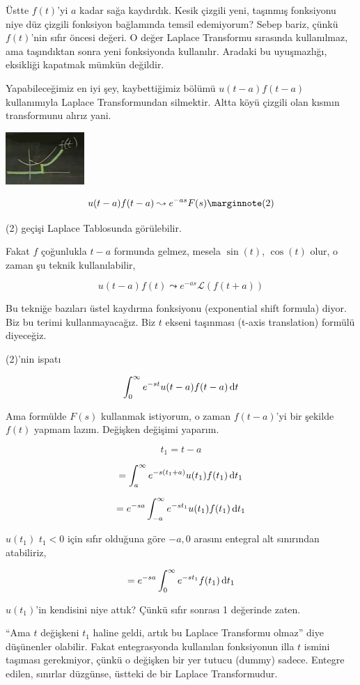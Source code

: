 \documentclass[12pt,fleqn]{article}\usepackage{../../common}
\begin{document}
Üstte $f(t)$'yi $a$ kadar sağa kaydırdık. Kesik çizgili yeni, taşınmış
fonksiyonu niye düz çizgili fonksiyon bağlamında temsil edemiyorum? Sebep
bariz, çünkü $f(t)$'nin sıfır öncesi değeri. O değer Laplace Transformu
sırasında kullanılmaz, ama taşındıktan sonra yeni fonksiyonda
kullanılır. Aradaki bu uyuşmazlığı, eksikliği kapatmak mümkün değildir. 

Yapabileceğimiz en iyi şey, kaybettiğimiz bölümü $u(t-a)f(t-a)$ kullanımıyla
Laplace Transformundan silmektir. Altta köyü çizgili olan kısmın
transformunu alırız yani.

\includegraphics[height=2cm]{22_8.png}

$$ u(t-a)f(t-a) \leadsto e^{-as}F(s) 
\mlabel{2}
$$

(2) geçişi Laplace Tablosunda görülebilir.

Fakat $f$ çoğunlukla $t-a$ formunda gelmez, mesela $\sin(t)$, $\cos(t)$
olur, o zaman şu teknik kullanılabilir,

$$ u(t-a)f(t) \leadsto e^{-as}\mathcal{L}(f(t+a)) $$

Bu tekniğe bazıları üstel kaydırma fonksiyonu (exponential shift formula)
diyor. Biz bu terimi kullanmayacağız. Biz $t$ ekseni taşınması (t-axis
translation) formülü diyeceğiz. 

(2)'nin ispatı

$$ \int_{0}^{\infty}e^{-st}u(t-a)f(t-a) \,\mathrm{d} t $$

Ama formülde $F(s)$ kullanmak istiyorum, o zaman $f(t-a)$'yi bir şekilde
$f(t)$ yapmam lazım. Değişken değişimi yaparım. 

$$ t_1 = t-a $$

$$ = \int_{a}^{\infty}e^{-s(t_1+a)}u(t_1)f(t_1) \,\mathrm{d} t_1 $$

$$ = e^{-sa} \int_{-a}^{\infty}e^{-st_1}u(t_1)f(t_1) \,\mathrm{d} t_1 $$

$u(t_1)$ $t_1<0$ için sıfır olduğuna göre $-a,0$ arasını entegral alt
sınırından atabiliriz, 

$$ = e^{-sa} \int_{0}^{\infty}e^{-st_1}f(t_1) \,\mathrm{d} t_1 $$

$u(t_1)$'in kendisini niye attık? Çünkü sıfır sonrası 1 değerinde zaten. 

``Ama $t$ değişkeni $t_1$ haline geldi, artık bu Laplace Transformu olmaz''
diye düşünenler olabilir. Fakat entegrasyonda kullanılan fonksiyonun illa
$t$ ismini taşıması gerekmiyor, çünkü o değişken bir yer tutucu (dummy)
sadece. Entegre edilen, sınırlar düzgünse, üstteki de bir Laplace
Transformudur.
\end{document}
